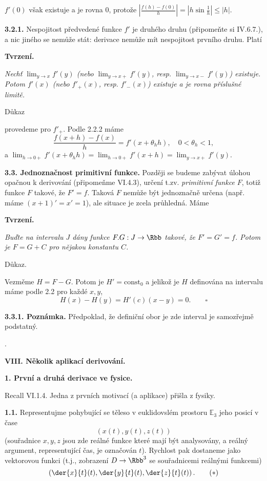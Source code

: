 \documentclass[12pt]{article}
\begin{document}
{{$f'(0)$ však existuje a je rovna 0, protože 
$\left|\frac{f(h)-f(0)}{h}\right|=\left|h\sin\frac1{h}\right|\leq|h|$.

\medskip
 
 {\bf 3.2.1.} Nespojitost předvedené funkce $f'$ je druhého druhu (připomeňte si IV.6.7.), a nic jiného se nemůže stát: derivace nemůže mít nespojitost prvního druhu. Platí
 
 \smallskip
 
 {\bf Tvrzení.} {\em Nechť $\lim_{y\to x}f'(y)$ (nebo
 $\lim_{y\to x+}f'(y)$, resp. $\lim_{y\to x-}f'(y)$) existuje. Potom $f'(x)$ (nebo $f'_+(x)$,  resp. $f'_-(x)$) existuje a je rovna příslušné limitě.
 
 Důkaz} provedeme pro $f'_+$.  Podle 2.2.2 máme
 $$
 \frac{f(x+h)-f(x)}{h}=f'(x+\theta_h h), \quad 0<\theta_h<1,
 $$
 a $\lim_{h\to 0+}f'(x+\theta_h h)=\lim_{h\to 0+}f'(x+h)
 =\lim_{y\to x+}f'(y)$.\sq
 
 \bigskip
 
 {\bf 3.3. Jednoznačnost primitivní funkce.}  Později se budeme zabývat úlohou  opačnou k derivování (připomeňme VI.4.3), určení t.zv. {\em primitivní funkce} $F$, toti\v z funkce $F$ takové, že $F'=f$. Taková $F$ nemůže být jednoznačně určena (např. máme $(x+1)'=x'=1$), ale situace je zcela průhledná. Máme
 
 \medskip
 
 {\bf Tvrzení.} {\em Buďte na intervalu $J$ dány funkce $F.G:J\to\Rbb$  takové, že
 $F'=G'=f$. Potom je  $F=G+C$ pro nějakou konstantu  $C$.
 
 Důkaz. } Vezměme $H=F-G$. Potom je $H'=\text{const}_0$ a jelikož je  $H$ definována na intervalu máme podle 2.2 pro každé $x,y$,
 $$
 H(x)-H(y)=H'(c)(x-y)=0.\quad\quad \square
 $$
 
 \medskip
 
 {\bf 3.3.1. Poznámka.} Předpoklad, že definiční obor je zde interval je samozřejmě podstatný.
 
 
\newpage
.
\newpage

\centerline{\Large\bf VIII. Několik aplikací derivování.} 

\vskip10mm
 
 {\large\bf 1. První a druhá derivace ve fysice.}
 
 \bigskip
 
 Recall  VI.1.4. Jedna z prvních motivací (a aplikace) přišla z fysiky.
 
 \medskip
 
 {\bf 1.1.} Representujme pohybující se těleso v euklidovslém prostoru $\mathbb E_3$ jeho posicí v čase
$$
 (x(t),y(t),z(t))
 $$
 (souřadnice $x,y,z$ jsou zde reálné funkce které mají být analysovány, a reálný argument, representující čas, je označován $t$). Rychlost pak dostaneme jako vektorovou funkci (t.j., zobrazení $D\to\Rbb^3$ se souřadnicemi reálnými funkcemi)
 \begin{equation}
 \left(\der{x}{t}(t),\der{y}{t}(t),\der{z}{t}(t)\right). \tag{$*$}
 \end{equation}
 
}}
\end{document}
